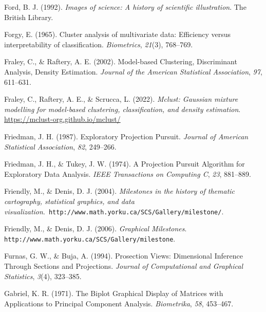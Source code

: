 \documentclass[
  letterpaper,
]{book}
\newlength{\cslhangindent}
\newlength{\cslentryspacingunit} %
\newenvironment{CSLReferences}[2] %
 {%
  \setlength{\parindent}{0pt}
  \ifodd #1
  \let\oldpar\par
  \def\par{\hangindent=\cslhangindent\oldpar}
  \fi
  \setlength{\parskip}{#2\cslentryspacingunit}
 }%
 {}
\begin{document}
\begin{CSLReferences}{1}{0}
\leavevmode{}%
Ford, B. J. (1992). \emph{Images of science: A history of scientific
illustration}. The British Library.

\leavevmode{}%
Forgy, E. (1965). Cluster analysis of multivariate data: Efficiency
versus interpretability of classification. \emph{Biometrics},
\emph{21}(3), 768--769.

\leavevmode{}%
Fraley, C., \& Raftery, A. E. (2002). Model-based {C}lustering,
{D}iscriminant {A}nalysis, {D}ensity {E}stimation. \emph{Journal of the
American Statistical Association}, \emph{97}, 611--631.

\leavevmode{}%
Fraley, C., Raftery, A. E., \& Scrucca, L. (2022). \emph{Mclust:
Gaussian mixture modelling for model-based clustering, classification,
and density estimation}. \url{https://mclust-org.github.io/mclust/}

\leavevmode{}%
Friedman, J. H. (1987). {E}xploratory {P}rojection {P}ursuit.
\emph{Journal of American Statistical Association}, \emph{82}, 249--266.

\leavevmode{}%
Friedman, J. H., \& Tukey, J. W. (1974). {A} {P}rojection {P}ursuit
{A}lgorithm for {E}xploratory {D}ata {A}nalysis. \emph{IEEE Transactions
on Computing C}, \emph{23}, 881--889.

\leavevmode{}%
Friendly, M., \& Denis, D. J. (2004). \emph{Milestones in the history of
thematic cartography, statistical graphics, and data
visualization}.{\texttt{\ http://www.math.yorku.ca/SCS/Gallery/milestone/}}.

\leavevmode{}%
Friendly, M., \& Denis, D. J. (2006). \emph{{G}raphical {M}ilestones}.
{\texttt{http://www.math.yorku.ca/SCS/Gallery/milestone}}.

\leavevmode{}%
Furnas, G. W., \& Buja, A. (1994). Prosection {V}iews: {D}imensional
{I}nference {T}hrough {S}ections and {P}rojections. \emph{Journal of
Computational and Graphical Statistics}, \emph{3}(4), 323--385.

\leavevmode{}%
Gabriel, K. R. (1971). The {B}iplot {G}raphical {D}isplay of {M}atrices
with {A}pplications to {P}rincipal {C}omponent {A}nalysis.
\emph{Biometrika}, \emph{58}, 453--467.


\end{CSLReferences}
\end{document}
